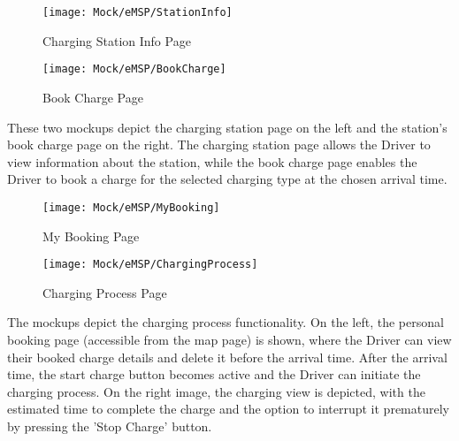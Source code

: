 \begin{preface}
\begin{figure}[H]
    \begin{minipage}[t]{.45\textwidth} %
    \texttt{[image: Mock/eMSP/StationInfo]}
    \caption{Charging Station Info Page}
    \label{fig:StationInfo}
\end{minipage}
\hfill
\begin{minipage}[t]{.45\textwidth}
    \texttt{[image: Mock/eMSP/BookCharge]}
    \caption{Book Charge Page}
    \label{fig:BookCharge}
\end{minipage}
\end{figure}
These two mockups depict the charging station page on the left and the station's book charge page on the right. The charging station page allows the Driver to view information about the station, while the book charge page enables the Driver to book a charge for the selected charging type at the chosen arrival time.
\end{preface}
\begin{preface}
\begin{figure}[H]
    \begin{minipage}[t]{.45\textwidth} %
    \texttt{[image: Mock/eMSP/MyBooking]}
    \caption{My Booking Page}
    \label{fig:MyBooking}
\end{minipage}
\hfill
\begin{minipage}[t]{.45\textwidth}
    \texttt{[image: Mock/eMSP/ChargingProcess]}
    \caption{Charging Process Page}
    \label{fig:ChargingProcess}
\end{minipage}
\end{figure}
The mockups depict the charging process functionality. On the left, the personal booking page (accessible from the map page) is shown, where the Driver can view their booked charge details and delete it before the arrival time. After the arrival time, the start charge button becomes active and the Driver can initiate the charging process. On the right image, the charging view is depicted, with the estimated time to complete the charge and the option to interrupt it prematurely by pressing the 'Stop Charge' button.
\end{preface}
\newpage
